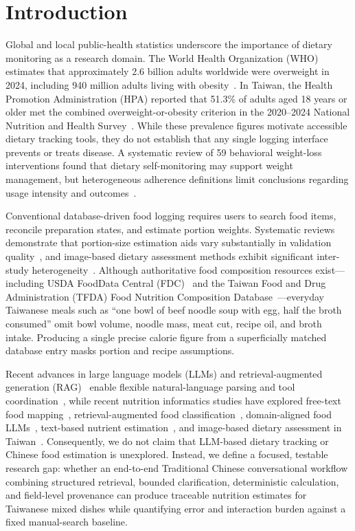 \documentclass[conference]{IEEEtran}
\begin{document}
\section{Introduction}
Global and local public-health statistics underscore the importance of dietary monitoring as a research domain. The World Health Organization (WHO) estimates that approximately 2.6 billion adults worldwide were overweight in 2024, including 940 million adults living with obesity~\cite{who2026obesity}. In Taiwan, the Health Promotion Administration (HPA) reported that 51.3\% of adults aged 18 years or older met the combined overweight-or-obesity criterion in the 2020--2024 National Nutrition and Health Survey~\cite{hpa2026obesity}. While these prevalence figures motivate accessible dietary tracking tools, they do not establish that any single logging interface prevents or treats disease. A systematic review of 59 behavioral weight-loss interventions found that dietary self-monitoring may support weight management, but heterogeneous adherence definitions limit conclusions regarding usage intensity and outcomes~\cite{raber2021systematic}.

Conventional database-driven food logging requires users to search food items, reconcile preparation states, and estimate portion weights. Systematic reviews demonstrate that portion-size estimation aids vary substantially in validation quality~\cite{amoutzopoulos2020portion}, and image-based dietary assessment methods exhibit significant inter-study heterogeneity~\cite{ho2020validity}. Although authoritative food composition resources exist---including USDA FoodData Central (FDC)~\cite{usda_fdc} and the Taiwan Food and Drug Administration (TFDA) Food Nutrition Composition Database~\cite{tfda_database}---everyday Taiwanese meals such as ``one bowl of beef noodle soup with egg, half the broth consumed'' omit bowl volume, noodle mass, meat cut, recipe oil, and broth intake. Producing a single precise calorie figure from a superficially matched database entry masks portion and recipe assumptions.

Recent advances in large language models (LLMs) and retrieval-augmented generation (RAG)~\cite{lewis2020rag} enable flexible natural-language parsing and tool coordination~\cite{yao2023react}, while recent nutrition informatics studies have explored free-text food mapping~\cite{lemay2026foodmapper}, retrieval-augmented food classification~\cite{zhou2026nutrirag}, domain-aligned food LLMs~\cite{gjorgjevikj2026foodyllm}, text-based nutrient estimation~\cite{lawabni2026text,cao2026chinese}, and image-based dietary assessment in Taiwan~\cite{chen2025diabot}. Consequently, we do not claim that LLM-based dietary tracking or Chinese food estimation is unexplored. Instead, we define a focused, testable research gap: whether an end-to-end Traditional Chinese conversational workflow combining structured retrieval, bounded clarification, deterministic calculation, and field-level provenance can produce traceable nutrition estimates for Taiwanese mixed dishes while quantifying error and interaction burden against a fixed manual-search baseline.
\end{document}
